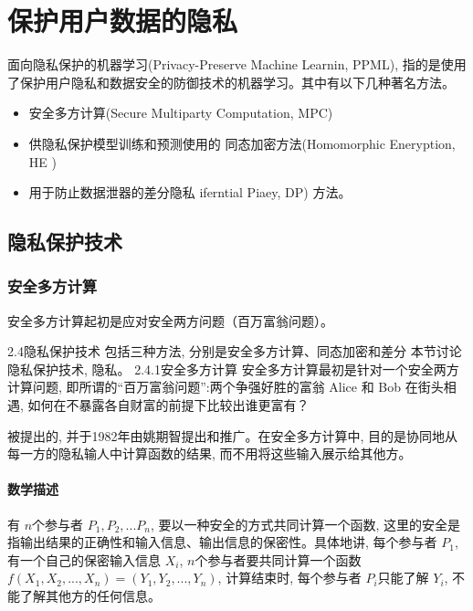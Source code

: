 \documentclass[a4paper]{article}
\begin{document}


\section{保护用户数据的隐私}
 面向隐私保护的机器学习(Privacy-Preserve Machine Learnin, PPML), 指的是使用了保护用户隐私和数据安全的防御技术的机器学习。其中有以下几种著名方法。\citep{ppmlmancuso}
 \begin{itemize}
     \item 
 安全多方计算(Secure Multiparty Computation,  MPC)
 \item 
 供隐私保护模型训练和预测使用的 同态加密方法(Homomorphic Eneryption,  HE )
 \item 
 用于防止数据泄器的差分隐私 iferntial Piaey, DP) 方法。
 \end{itemize}
 
 \subsection{隐私保护技术}
 \subsubsection{安全多方计算}
 安全多方计算起初是应对安全两方问题（百万富翁问题）。 
  
2.4隐私保护技术
包括三种方法, 分别是安全多方计算、同态加密和差分
本节讨论隐私保护技术, 
隐私。
2.4.1安全多方计算
安全多方计算最初是针对一个安全两方计算问题, 即所谓的“百万富翁问题”:两个争强好胜的富翁 Alice 和 Bob 在街头相遇, 如何在不暴露各自财富的前提下比较出谁更富有？\citep{scyao1982}

被提出的, 并于1982年由姚期智提出和推广。在安全多方计算中, 目的是协同地从每一方的隐私输人中计算函数的结果, 而不用将这些输入展示给其他方。
\paragraph{数学描述}
有 $n $个参与者 $P_1, P_2, ...P_n$, 要以一种安全的方式共同计算一个函数, 这里的安全是指输出结果的正确性和输入信息、输出信息的保密性。具体地讲, 每个参与者 $P_1$, 有一个自己的保密输入信息 $X_i$, $n $个参与者要共同计算一个函数 $f(X_1, X_2, ... , X_n)=(Y_1, Y_2,  ... , Y_n)$,  计算结束时, 每个参与者 $P_i $只能了解 $Y_i$,  不能了解其他方的任何信息。
\end{document}
